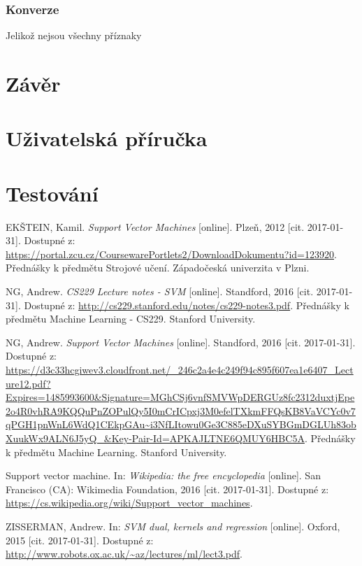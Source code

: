 \documentclass[a4]{article}
\begin{document}
\subsubsection{Konverze}
Jelikož nejsou všechny příznaky 

\newpage

\section{Závěr}

\section{Uživatelská příručka}

\section{Testování}

\appendix
\begin{thebibliography}{99}

EKŠTEIN, Kamil. \textit{Support Vector Machines} [online]. Plzeň, 2012 [cit. 2017-01-31]. Dostupné z: \url{https://portal.zcu.cz/CoursewarePortlets2/DownloadDokumentu?id=123920}. Přednášky k předmětu Strojové učení. Západočeská univerzita v Plzni.

NG, Andrew. \textit{CS229 Lecture notes - SVM} [online]. Standford, 2016 [cit. 2017-01-31]. Dostupné z: \url{http://cs229.stanford.edu/notes/cs229-notes3.pdf}. Přednášky k předmětu Machine Learning - CS229. Stanford University.

NG, Andrew. \textit{Support Vector Machines} [online]. Standford, 2016 [cit. 2017-01-31]. Dostupné z: \url{https://d3c33hcgiwev3.cloudfront.net/_246c2a4e4c249f94c895f607ea1e6407_Lecture12.pdf?Expires=1485993600&Signature=MGhCSj6vnfSMVWpDERGUz8fc2312duxtjEpe2o4R0vhRA9KQQuPnZOPulQy5I0mCrICpxj3M0efelTXkmFFQsKB8VaVCYc0v7qPGH1pnWnL6WdQ1CEkpGAu~i3NfLItowu0Ge3C885eDXuSYBGmDGLUh83obXuukWx9ALN6J5yQ_&Key-Pair-Id=APKAJLTNE6QMUY6HBC5A}. Přednášky k předmětu Machine Learning. Stanford University.

Support vector machine. In: \textit{Wikipedia: the free encyclopedia} [online]. San Francisco (CA): Wikimedia Foundation, 2016 [cit. 2017-01-31]. Dostupné z: \url{https://cs.wikipedia.org/wiki/Support_vector_machines}.

ZISSERMAN, Andrew. In: \textit{SVM dual, kernels and regression} [online]. Oxford, 2015 [cit. 2017-01-31]. Dostupné z: \url{http://www.robots.ox.ac.uk/~az/lectures/ml/lect3.pdf}.

\end{thebibliography}
\end{document}

